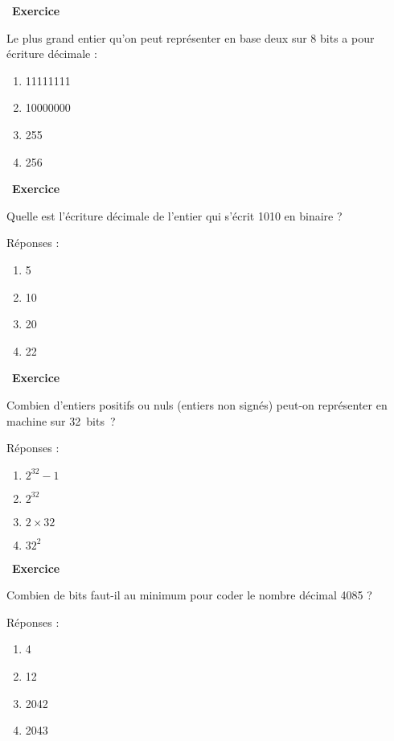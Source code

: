 \documentclass[
  11pt,
]{article}
\providecommand{\tightlist}{%
  \setlength{\itemsep}{0pt}\setlength{\parskip}{0pt}}
\newcounter{exo}
\newenvironment{exercice}[1]
{\par \medskip   \addtocounter{exo}{1} \noindent  
\begin{bclogo}[arrondi =0.1,   noborder = true, logo=\bccrayon, marge=4]{~\textbf{Exercice} \textbf{\theexo} {\itshape #1} }  \par}
{
\end{bclogo}
 \par \bigskip }
\newcounter{def}
\begin{document}
\begin{exercice}{}

Le plus grand entier qu'on peut représenter en base deux sur 8 bits a
pour écriture décimale :

\begin{enumerate}
\def\labelenumi{\arabic{enumi}.}
\tightlist
\item
  11111111
\item
  10000000
\item
  255
\item
  256
\end{enumerate}

\end{exercice}

\begin{exercice}{}

Quelle est l'écriture décimale de l'entier qui s'écrit 1010 en binaire ?

Réponses :

\begin{enumerate}
\def\labelenumi{\arabic{enumi}.}
\item
  5
\item
  10
\item
  20
\item
  22
\end{enumerate}

\end{exercice}

\begin{exercice}{}

Combien d'entiers positifs ou nuls (entiers non signés) peut-on
représenter en machine sur 32~bits~?

Réponses :

\begin{enumerate}
\def\labelenumi{\arabic{enumi}.}
\tightlist
\item
  \(2^{32}-1\)
\item
  \(2^{32}\)
\item
  \(2 \times 32\)
\item
  \(32^{2}\)
\end{enumerate}

\end{exercice}

\begin{exercice}{}

Combien de bits faut-il au minimum pour coder le nombre décimal 4085 ?

Réponses :

\begin{enumerate}
\def\labelenumi{\arabic{enumi}.}
\tightlist
\item
  4
\item
  12
\item
  2042
\item
  2043
\end{enumerate}

\end{exercice}
\end{document}
